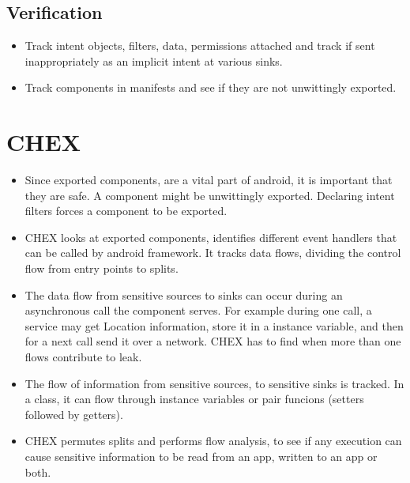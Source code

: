\documentclass[11pt]{article} %
\begin{document}
\subsection {Verification}
\begin {itemize} \itemsep -2pt
\item Track intent objects, filters, data, permissions attached and track if sent
inappropriately as an implicit intent at various sinks.
\item Track components in manifests and see if they are not unwittingly exported.
\end {itemize}
\section {CHEX}
\begin {itemize} \itemsep -2pt
\item Since exported components, are a vital part of android, it is important
that they are safe. A component might be unwittingly exported. Declaring intent
filters forces a component to be exported.
\item CHEX looks at exported components, identifies different event handlers that
can be called by android framework. It tracks data flows, dividing the control
flow from entry points to splits.
\item The data flow from sensitive sources to sinks can occur during an asynchronous
call the component serves. For example during one call, a service may get Location
information, store it in a instance variable, and then for a next call send it
over a network. CHEX has to find when more than one flows contribute to leak.
\item The flow of information from sensitive sources, to sensitive sinks is tracked.
In a class, it can flow through instance variables or pair funcions (setters
followed by getters).
\item CHEX permutes splits and performs flow analysis, to see if any execution 
can cause sensitive information to be read from an app, written to an app or both.
\end {itemize}
\end{document}
